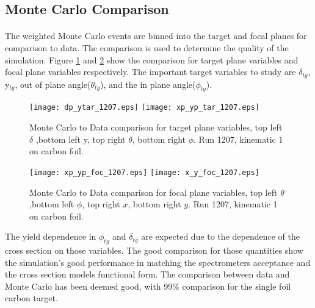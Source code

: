 \subsection{Monte Carlo Comparison}
\paragraph{}The weighted Monte Carlo events are binned into the target and focal planes for comparison to data. The comparison is used to determine the quality of the simulation. Figure \ref{tcomp} and \ref{fcomp} show the comparison for target plane variables and focal plane variables respectively. The important target variables to study are $\delta_{tg}$, y$_{tg}$, out of plane angle($\theta_{tg}$), and the in plane angle($\phi_{tg}$). 
\begin{figure}[h]
	\caption{Monte Carlo to Data comparison for target plane variables, top left $\delta$ ,bottom left y, top right $\theta$, bottom right $\phi$. Run 1207, kinematic 1 on carbon foil.\label{tcomp}}
	{\centering
	\hspace{-50pt}
	\texttt{[image: dp\_ytar\_1207.eps]}
	\texttt{[image: xp\_yp\_tar\_1207.eps]}
}
\end{figure}
\begin{figure}[H]
	\caption{Monte Carlo to Data comparison for focal plane variables, top left $\theta$ ,bottom left $\phi$, top right $x$, bottom right $y$. Run 1207, kinematic 1 on carbon foil. \label{fcomp} }
	{\centering
	\hspace{-50pt}
	\texttt{[image: xp\_yp\_foc\_1207.eps]}
	\texttt{[image: x\_y\_foc\_1207.eps]}}
\end{figure}
The yield dependence in $\phi_{tg}$ and $\delta_{tg}$ are expected due to the dependence of the cross section on those variables. The good comparison for those quantities show the simulation's good performance in matching the spectrometers acceptance and the cross section models functional form. The comparison between data and Monte Carlo has been deemed good, with 99\% comparison for the single foil carbon target. 


